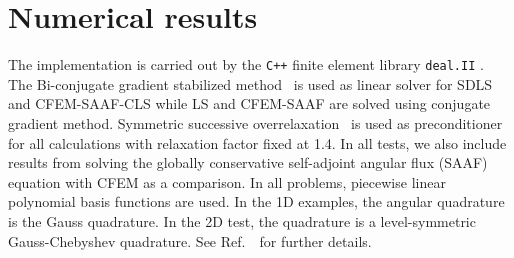 \documentclass[review]{elsarticle}
\begin{document}
\section{Numerical results}\label{s:numerics}
The implementation is carried out by the {\tt C++}  finite element library {\tt deal.II} \cite{dealii82}. {The Bi-conjugate gradient stabilized method \cite{bicgstab}\ is used as linear solver for SDLS and CFEM-SAAF-CLS while LS and CFEM-SAAF are solved using conjugate gradient method. Symmetric successive overrelaxation \cite{numerical}\ is used as preconditioner for all calculations with relaxation factor fixed at 1.4}. In all tests, we also include results from solving the globally conservative self-adjoint angular flux (SAAF) equation with CFEM as a comparison\cite{morel_saaf,yaqi_void}. In all problems, piecewise linear polynomial basis functions are used. {In the 1D examples, the angular quadrature is the Gauss quadrature. In the 2D test, the quadrature is a level-symmetric Gauss-Chebyshev quadrature. See Ref.\ \cite{josh-quad}\ for further details}. 
%
%
\end{document}
